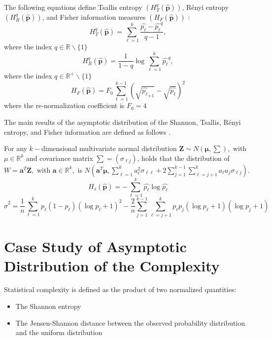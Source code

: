 The following equations define Tsallis entropy $	(H_{T}^{q}(\widehat{\bm{p}}))$, Rényi entropy $(H_{R}^{q}(\widehat{\bm{p}}))$, and Fisher information measures $(H_{F}(\widehat{\bm{p}}))$ \cite{sanchez2009discrete} :
\begin{equation}
	H_{T}^{q}(\widehat{\bm{p}})=\sum_{\ell=1}^{k}\dfrac{\widehat{p_\ell}-\widehat{p_\ell}^q}{q-1},
\end{equation}
where the index $q\in \mathbb{R}\backslash \{1\}$
\begin{equation}
	H_{R}^{q}(\widehat{\bm{p}})=\dfrac{1}{1-q} \log \sum_{\ell=1}^{k}{\widehat{p_\ell}}^q,
\end{equation}
where the index $q\in \mathbb{R}^{+}\backslash \{1\}$
\begin{equation}
	H_F(\widehat{\bm{p}})=F_0\sum_{\ell=1}^{k-1}(\sqrt{\widehat{p_\ell}_{+1}}-\sqrt{\widehat{p_\ell}})^2
\end{equation}
where the re-normalization coefficient is $F_0=4$ \cite{sanchez2009discrete}

The main results of the asymptotic distribution of the Shannon, Tsallis, Rényi entropy, and Fisher information are defined as follows \cite{Rey2023}. 

For any $k-$dimensional multivariate normal distribution $\bm{Z}\sim N(\bm{\mu},\sum),$ with $\mu \in \mathbb{R}^k$ and covariance matrix $\sum=(\sigma_{{\ell}{j}})$, holds that the distribution of $W=\bm{a}^T\bm{Z},$ with $\bm{a} \in \mathbb{R}^k,$ is $N(\bm{a}^T\bm{\mu},\sum_{\ell=1}^{k}a_\ell^2 \sigma_{{\ell}{\ell}}+2\sum_{j=1}^{k-1}\sum_{\ell=j+1}^{k} a_\ell a_j\sigma_{{\ell}{j}})$. 
\begin{equation}
	H_s(\widehat{\bm{p}})=-\sum_{\ell=1}^{k}\widehat{p_\ell}\log\widehat{p_\ell}
\end{equation}
\begin{equation}
	\widehat{\sigma}^2=\dfrac{1}{n}\sum_{\ell=1}^{k}p_\ell(1-p_\ell)(\log p_\ell+1)^2-\dfrac{2}{n}\sum_{j=1}^{k-1}\sum_{\ell=j+1}^{k}p_\ell p_j(\log p_\ell+1)(\log p_j+1)
\end{equation}

\section{Case Study of Asymptotic Distribution of the Complexity} 

Statistical complexity is defined as the product of two normalized quantities:
\begin{itemize}
	\item The Shannon entropy
	\item The Jensen-Shannon distance between the observed probability distribution and the uniform distribution 
\end{itemize}

